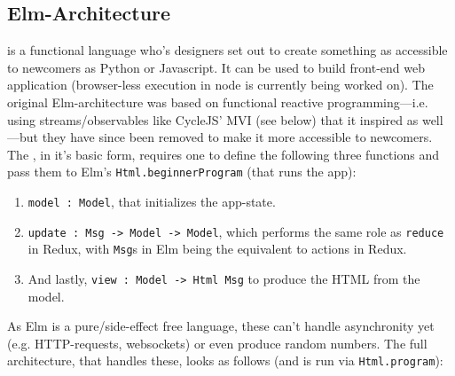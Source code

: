 \subsection{Elm-Architecture}

 is a functional language who's designers set out to create something as accessible to newcomers as Python or Javascript. It can be used to build front-end web application (browser-less execution in node is currently being worked on). The original Elm-architecture was based on functional reactive programming---i.e. using streams/observables like CycleJS' MVI (see below) that it inspired as well---but they have since been removed to make it more accessible to
newcomers. The , in it's basic form, requires one to define the following three functions and pass them to Elm's \texttt{Html.beginnerProgram} (that runs the app):


\begin{enumerate}
    \item \texttt{model : Model}, that initializes the app-state.
    \item \texttt{update : Msg -> Model -> Model}, which performs the same role as \texttt{reduce} in Redux, with \texttt{Msg}s in Elm being the equivalent to actions in Redux.
    \item And lastly, \texttt{view : Model -> Html Msg} to produce the HTML from the model.
\end{enumerate}

As Elm is a pure/side-effect free language, these can't handle asynchronity yet (e.g. HTTP-requests, websockets) or even produce random numbers. The full architecture, that handles these, looks as follows (and is run via \texttt{Html.program}):

